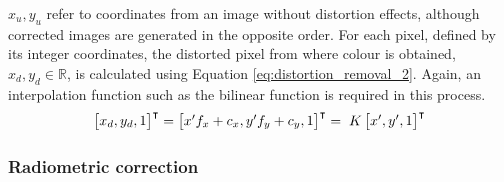 $x_u, y_u$ refer to coordinates from an image without distortion effects, although corrected images are generated in the opposite order. For each pixel, defined by its integer coordinates, the distorted pixel from where colour is obtained, $x_{d}, y_{d} \in{\mathbb{R}}$, is calculated using Equation \ref{eq:distortion_removal_2}. Again, an interpolation function such as the bilinear function is required in this process.
\begin{gather}
    \label{eq:distortion_removal_2}
    \begin{aligned}
        \begin{bmatrix} 
            x_d, y_d, 1
        \end{bmatrix}^\intercal 
        =
        \begin{bmatrix}
            {x'}f_x + c_x, {y'}f_y + c_y, 1
        \end{bmatrix}^\intercal
        =
        \hspace{1mm} K \begin{bmatrix}
            {x'}, {y'}, 1
        \end{bmatrix}^\intercal
    \end{aligned}
\end{gather}

\subsubsection{Radiometric correction}

